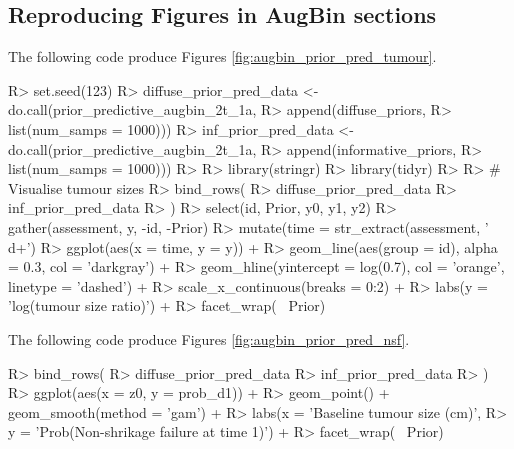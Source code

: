 \documentclass[article]{jss}
\begin{document}
\hypertarget{reproducing-figures-in-augbin-sections}{%
\subsection{Reproducing Figures in AugBin
sections}\label{reproducing-figures-in-augbin-sections}}

The following code produce Figures \ref{fig:augbin_prior_pred_tumour}.

\begin{CodeChunk}

\begin{CodeInput}
R> set.seed(123)
R> diffuse_prior_pred_data <- do.call(prior_predictive_augbin_2t_1a, 
R>                                    append(diffuse_priors, 
R>                                           list(num_samps = 1000)))
R> inf_prior_pred_data <- do.call(prior_predictive_augbin_2t_1a, 
R>                                append(informative_priors, 
R>                                       list(num_samps = 1000)))
R> 
R> library(stringr)
R> library(tidyr)
R> 
R> # Visualise tumour sizes
R> bind_rows(
R>   diffuse_prior_pred_data %
R>   inf_prior_pred_data %
R> ) %
R>   select(id, Prior, y0, y1, y2) %
R>   gather(assessment, y, -id, -Prior) %
R>   mutate(time = str_extract(assessment, '\\d+') %
R>   ggplot(aes(x = time, y = y)) + 
R>   geom_line(aes(group = id), alpha = 0.3, col = 'darkgray') + 
R>   geom_hline(yintercept = log(0.7), col = 'orange', linetype = 'dashed') + 
R>   scale_x_continuous(breaks = 0:2) + 
R>   labs(y = 'log(tumour size ratio)') + 
R>   facet_wrap(~ Prior)
\end{CodeInput}
\end{CodeChunk}

The following code produce Figures \ref{fig:augbin_prior_pred_nsf}.

\begin{CodeChunk}

\begin{CodeInput}
R> bind_rows(
R>   diffuse_prior_pred_data %
R>   inf_prior_pred_data %
R> ) %
R>   ggplot(aes(x = z0, y = prob_d1)) + 
R>   geom_point() + geom_smooth(method = 'gam') +
R>   labs(x = 'Baseline tumour size (cm)', 
R>        y = 'Prob(Non-shrikage failure at time 1)') + 
R>   facet_wrap(~ Prior)
\end{CodeInput}
\end{CodeChunk}
\end{document}
